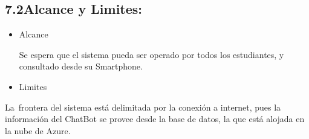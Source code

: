 \documentclass[12pt]{report}
\begin{document}
\subsection*{7.2\hspace*{10pt}Alcance y Limites:}
\begin{itemize}
	\item {\fontsize{10pt}{12.0pt}\selectfont Alcance\par}\par

{\fontsize{10pt}{12.0pt}\selectfont Se espera que el sistema pueda ser operado por todos los estudiantes, y consultado desde su Smartphone.\par}\par


\vspace{\baselineskip}
	\item {\fontsize{10pt}{12.0pt}\selectfont Limites\par}
\end{itemize}\par

\begin{adjustwidth}{1.0in}{0.0in}
{\fontsize{10pt}{12.0pt}\selectfont La\ frontera del sistema está delimitada por la conexión a internet, pues la información del ChatBot se provee desde la base de datos, la que está alojada en la  nube de Azure.\par}\par

\end{adjustwidth}


\vspace{\baselineskip}
\end{document}
